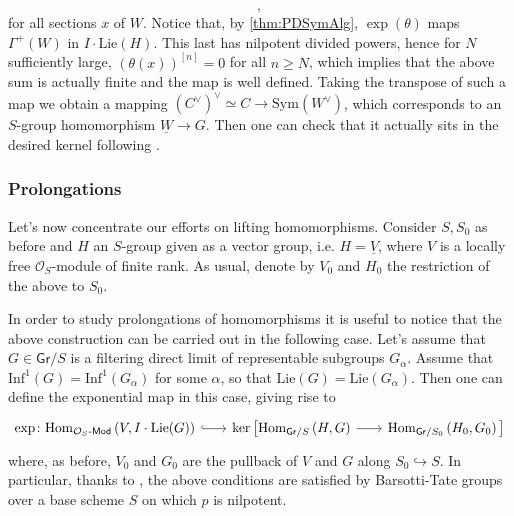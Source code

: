 \begin{defn}
\begin{equation*}
	,\end{equation*}
	for all sections $x$ of $W$.
	Notice that, by \cref{thm:PDSymAlg}, $\exp (\theta)$
	maps $\Gamma^+(W)$ in $I \cdot \mathrm{Lie}(H)$.
	This last has nilpotent divided powers, hence for $N$ sufficiently
	large, $(\theta(x))^{[n]} = 0$ for all $n \geq N$,
	which implies that the above sum is actually finite
	and the map is well defined.
	Taking the transpose of such a map we obtain a mapping 
	$(C^\vee)^\vee \simeq C \to \mathrm{Sym}(W^\vee)$, which corresponds
	to an $S$-group homomorphism $\underline{W} \to G$.
	Then one can check that it actually sits in the desired kernel
	following \cite[Chapter III, \S2.4, \S2.6]{Messing}.
\end{defn}



\subsubsection{Prolongations}
Let's now concentrate our efforts on lifting homomorphisms.
Consider $S, S_0$ as before and
$H$ an $S$-group given as a vector group,
i.e. $H = \underline{V}$, where $V$ is a locally free $\mathcal{O}_{ S }$-module
of finite rank.
As usual, denote by $V_0$ and $H_0$ the restriction of the above to $S_0$.


\begin{rem}
	In order to study prolongations of homomorphisms it is useful to notice that
	the above construction can be carried out in the following case.
	Let's assume that $G \in \mathsf{Gr}/S$ is a filtering direct limit of
	representable subgroups $G_\alpha$.
	Assume that $\mathrm{Inf}^1(G) = \mathrm{Inf}^1(G_\alpha)$ for some $\alpha$,
	so that $\mathrm{Lie}(G) = \mathrm{Lie}(G_\alpha)$.
	Then one can define the exponential map in this case, giving rise to
	\begin{equation*}
	\begin{tikzcd}[row sep = 0ex, column sep = 1.90em
		,/tikz/column 1/.append style={anchor=base east}
		,/tikz/column 2/.append style={anchor=base west}]
		\exp\colon
		\mathrm{Hom}_{ \mathcal{O}_{ S }\text{-}\mathsf{Mod} }
		\left( V, I \cdot \mathrm{Lie}(G) \right)
		\arrow[r, "", hookrightarrow] &
		\ker \big[ 
		\mathrm{Hom}_{ \mathsf{Gr}/S } 
		\left( H, G \right)
		\arrow[r, "", rightarrow] &
		\mathrm{Hom}_{ \mathsf{Gr}/S_0 }
		\left( H_0, G_0 \right)
		\big]
	\end{tikzcd}
	\end{equation*} 
	where, as before, $V_0$ and $G_0$ are the pullback of $V$ and $G$ 
	along $S_0 \hookrightarrow S$.
	In particular, thanks to \cite[Chapter II, Corollary 3.3.16]{Messing},
	the above conditions are satisfied by Barsotti-Tate
	groups over a base scheme $S$ on which $p$ is nilpotent.
\end{rem}


